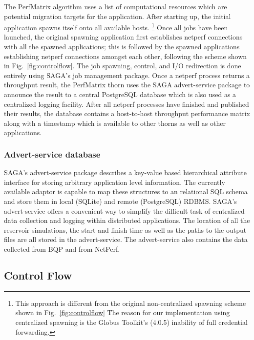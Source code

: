\documentclass[conference,final]{IEEEtran}
\begin{document}
The PerfMatrix algorithm uses a list of computational resources which
are potential migration targets for the application. After starting
up, the initial application spawns itself onto all available hosts.
\footnote{This approach is different from the original non-centralized
  spawning scheme shown in Fig.~\ref{fig:controlflow} The reason for
  our implementation using centralized spawning is the Globus
  Toolkit's (4.0.5) inability of full credential forwarding.} Once all
jobs have been launched, the original spawning application first
establishes netperf connections with all the spawned applications;
this is followed by the spawned applications establishing netperf
connections amongst each other, following the scheme shown in
Fig.~\ref{fig:controlflow}.  The job spawning, control, and I/O
redirection is done entirely using SAGA's job management package.
Once a netperf process returns a throughput result, the PerfMatrix
thorn uses the SAGA advert-service package to announce the result to a
central PostgreSQL database which is also used as a centralized
logging facility. After all netperf processes have finished and
published their results, the database contains a host-to-host
throughput performance matrix along with a timestamp which is
available to other thorns as well as other applications.

\subsubsection{Advert-service database} SAGA's advert-service package
describes a key-value based hierarchical attribute interface for
storing arbitrary application level information. The currently available adaptor is
capable to map these structures to an relational SQL schema and store
them in local (SQLite) and remote (PostgreSQL) RDBMS. SAGA's advert-service offers a convenient way to simplify the
difficult task of centralized data collection and logging within
distributed applications. The location of all the reservoir
simulations, the start and finish time as well as the paths to the
output files are all stored in the advert-service. The advert-service
also contains the data collected from BQP and from NetPerf.

\subsection{Control Flow}
\end{document}
